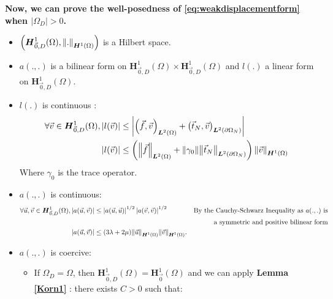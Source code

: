 \documentclass[a4paper,12pt,twoside]{report}
\begin{document}
\noindent \textbf{Now, we can prove the well-posedness of \eqref{eq:weakdisplacementform} when $\left| \Omega_D \right| > 0$.}
\begin{itemize}
    \item $\left(\boldsymbol H^1_{\vec 0,D}(\Omega), \norm{.}_{\boldsymbol H^1(\Omega)} \right)$ is a Hilbert space.
    \item $a(.,.)$ is a bilinear form on $\boldsymbol H^1_{\vec 0,D}(\Omega) \times \boldsymbol H^1_{\vec 0,D}(\Omega)$ and $l(.)$ a linear form on $\boldsymbol H^1_{\vec 0,D}(\Omega)$.
    \item $l(.)$ is continuous : \begin{equation*}
    \begin{aligned}    
    \forall \vec v \in \boldsymbol H^1_{\vec 0,D}(\Omega), \left|l(\vec v)\right| 
    & \leq \left| \left(\vec f, \vec v \right)_{\boldsymbol L^2(\Omega)} + \left(\vec t_N, \vec v \right)_{\boldsymbol L^2(\partial \Omega_N)} \right| \\
    \left|l(\vec v)\right| 
    & \leq \left( \norm{\vec f}_{\boldsymbol L^2(\Omega)} + \norm{\gamma_0} \norm{\vec t_N}_{\boldsymbol L^2(\partial \Omega_N)}\right)\norm{\vec v}_{\boldsymbol H^1(\Omega)}\\
    \end{aligned}
    \end{equation*}
	Where $\gamma_0$ is the trace operator.
    \item $a(.,.)$ is continuous: 
    \begin{equation*}
        \begin{aligned}
        \forall \vec u, \vec v \in \boldsymbol H^1_{\vec 0,D}(\Omega), \left| a(\vec u, \vec v) \right| 
        & \leq \left| a(\vec u, \vec u) \right|^{1/2} \left| a(\vec v, \vec v) \right|^{1/2} & \text{By the Cauchy-Schwarz Inequality as $a(.,.)$ is} \\
        & & \text{a symmetric and positive bilinear form} \\
        \left| a(\vec u, \vec v) \right| & \leq (3\lambda + 2\mu)\norm{\vec u}_{\boldsymbol H^1(\Omega)}\norm{\vec v}_{\boldsymbol H^1(\Omega)}.
        \end{aligned}
    \end{equation*}
    \item $a(.,.)$ is coercive: 
        \begin{itemize}
            \item If $\Omega_D = \Omega$, then $\boldsymbol H^1_{\vec 0,D}(\Omega) = \boldsymbol H^1_{\vec 0}(\Omega)$ and we can apply \textbf{Lemma \ref{Korn1}} : there exists $C > 0$ such that:

\end{itemize}
\end{itemize}
\end{document}
